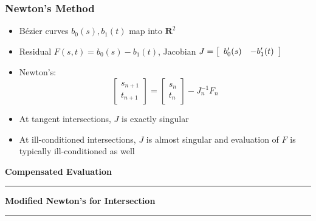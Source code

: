\documentclass{beamer}
\begin{document}
\begin{frame}
\frametitle{Newton's Method}
\begin{itemize}
\item B\'{e}zier curves \(b_0(s), b_1(t)\) map into \(\mathbf{R}^2\)
\pause
\item Residual \(F(s, t) = b_0(s) - b_1(t)\), Jacobian \(J =
\left[ \begin{array}{c c} b_0'(s) & -b_1'(t) \end{array}\right]\)
\pause
\item Newton's:
\begin{equation*}
\left[ \begin{array}{c} s_{n + 1} \\ t_{n + 1} \end{array}\right] =
\left[ \begin{array}{c} s_n \\ t_n \end{array}\right] -
J_n^{-1} F_n
\end{equation*}
\pause
\item At tangent intersections, \(J\) is exactly singular
\pause
\item At ill-conditioned intersections, \(J\) is almost singular and
  evaluation of \(F\) is typically ill-conditioned as well
\end{itemize}
\end{frame}


\begin{frame}
\centering
{\Large \bf Compensated Evaluation}
\rule{0.82\textwidth}{1pt}
\end{frame}


\begin{frame}
\centering
{\Large \bf Modified Newton's for Intersection}
\rule{0.82\textwidth}{1pt}
\end{frame}
\end{document}
